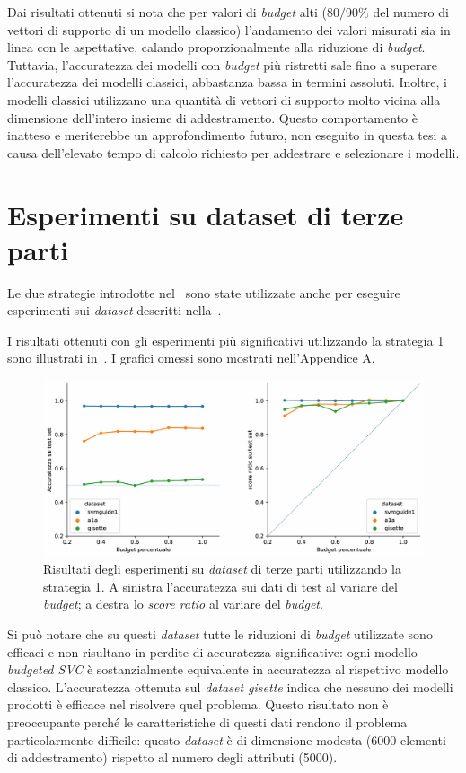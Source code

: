 Dai risultati ottenuti si nota che per valori di \emph{budget} alti ($80/90\%$ del numero di vettori di supporto di un modello classico) l'andamento dei valori misurati sia in linea con le aspettative, calando proporzionalmente alla riduzione di \emph{budget}.
Tuttavia, l'accuratezza dei modelli con \emph{budget} più ristretti sale fino a superare l'accuratezza dei modelli classici, abbastanza bassa in termini assoluti.
Inoltre, i modelli classici utilizzano una quantità di vettori di supporto molto vicina alla dimensione dell'intero insieme di addestramento.
Questo comportamento è inatteso e meriterebbe un approfondimento futuro, non eseguito in questa tesi a causa dell'elevato tempo di calcolo richiesto per addestrare e selezionare i modelli.

\section{Esperimenti su dataset di terze parti}\label{sec:exp:real_ds}
Le due strategie introdotte nel~ sono state utilizzate anche per eseguire esperimenti sui \emph{dataset} descritti nella~.

I risultati ottenuti con gli esperimenti più significativi utilizzando la strategia 1 sono illustrati in~. I grafici omessi sono mostrati nell'Appendice A.
\begin{figure}
    \centering
    \includegraphics[width=1\linewidth]{img//TP/tp_old_strategy.pdf}
    \caption[Risultati degli esperimenti su \emph{dataset} di terze parti utilizzando la strategia 1.]{Risultati degli esperimenti su \emph{dataset} di terze parti utilizzando la strategia 1. A sinistra l'accuratezza sui dati di test al variare del \emph{budget}; a destra lo \emph{score ratio} al variare del \emph{budget}.}
    \label{fig:TP_old_strategy}
\end{figure}
Si può notare che su questi \emph{dataset} tutte le riduzioni di \emph{budget} utilizzate sono efficaci e non risultano in perdite di accuratezza significative: ogni modello \emph{budgeted SVC} è sostanzialmente equivalente in accuratezza al rispettivo modello classico.
L'accuratezza ottenuta sul \emph{dataset gisette} indica che nessuno dei modelli prodotti è efficace nel risolvere quel problema. Questo risultato non è preoccupante perché le caratteristiche di questi dati rendono il problema particolarmente difficile: questo \emph{dataset} è di dimensione modesta (6000 elementi di addestramento) rispetto al numero degli attributi (5000).

